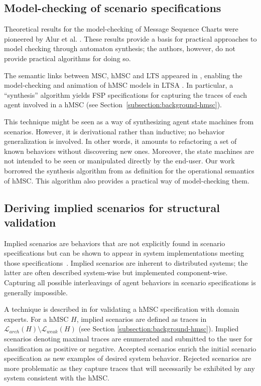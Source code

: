 
\subsection{Model-checking of scenario specifications\label{section:related-for-analysis-2}}

Theoretical results for the model-checking of Message Sequence Charts were pioneered by Alur et al. \cite{Alur:1999, Alur:2000}. These results provide a basis for practical approaches to model checking through automaton synthesis; the authors, however, do not provide practical algorithms for doing so.

The semantic links between MSC, hMSC and LTS appeared in \cite{Uchitel:2001, Uchitel:2001b}, enabling the model-checking and animation of hMSC models in LTSA \cite{Uchitel:2003, Magee:1999}. In particular, a ``synthesis'' algorithm yields FSP specifications for capturing the traces of each agent involved in a hMSC (see Section~\ref{subsection:background-hmsc}). 

This technique might be seen as a way of synthesizing agent state machines from scenarios. However, it is derivational rather than inductive; no behavior generalization is involved. In other words, it amounts to refactoring a set of known behaviors without discovering new ones. Moreover, the state machines are not intended to be seen or manipulated directly by the end-user. Our work borrowed the synthesis algorithm from \cite{Uchitel:2003} as definition for the operational semantics of hMSC. This algorithm also provides a practical way of model-checking them.


\subsection{Deriving implied scenarios for structural validation\label{section:related-for-analysis-3}}

Implied scenarios are behaviors that are not explicitly found in scenario specifications but can be shown to appear in system implementations meeting those specifications~\cite{Alur:2000, Uchitel:2004}. Implied scenarios are inherent to distributed systems; the latter are often described system-wise but implemented component-wise. Capturing all possible interleavings of agent behaviors in scenario specifications is generally impossible.

A technique is described in \cite{Uchitel:2004} for validating a hMSC specification with domain experts. For a hMSC $H$, implied scenarios are defined as traces in $\mathcal{L}_{arch}(H) \setminus \mathcal{L}_{weak}(H)$ (see Section \ref{subsection:background-hmsc}). Implied scenarios denoting maximal traces are enumerated and submitted to the user for classification as positive or negative. Accepted scenarios enrich the initial scenario specification as new examples of desired system behavior. Rejected scenarios are more problematic as they capture traces that will necessarily be exhibited by any system consistent with the hMSC.


